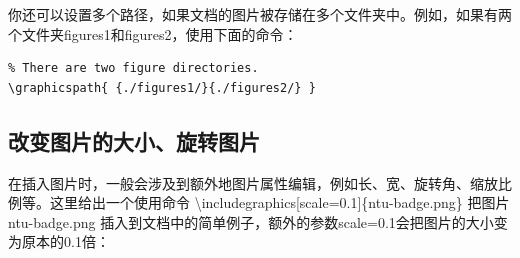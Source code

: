 你还可以设置多个路径，如果文档的图片被存储在多个文件夹中。例如，如果有两个文件夹figures1和figures2，使用下面的命令：
\begin{verbatim}
% There are two figure directories.
\graphicspath{ {./figures1/}{./figures2/} }
\end{verbatim}





\subsection{改变图片的大小、旋转图片}
在插入图片时，一般会涉及到额外地图片属性编辑，例如长、宽、旋转角、缩放比例等。这里给出一个使用命令 \backslash includegraphics[scale=0.1]\{ntu-badge.png\} 把图片 ntu-badge.png 插入到文档中的简单例子，额外的参数scale=0.1会把图片的大小变为原本的0.1倍：
